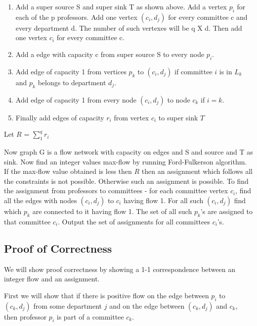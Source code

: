 \documentclass[11pt]{article}
\begin{document}
\begin{enumerate}
\item Add a super source S and super sink T as shown above. Add a vertex $p_i$ for each of the p professors. Add one vertex $(c_i,d_j)$ for every committee c and every department d. The number of such vertexes will be q X d. Then add one vertex $c_i$ for every committee c.
\item Add a edge with capacity c from super source S to every node $p_i$. 
\item Add edge of capacity 1 from vertices $p_k$ to $(c_i,d_j)$ if committee $i$ is in $L_k$ and $p_k$ belongs to department $d_j$.
\item Add edge of capacity 1 from every node $(c_i,d_j)$ to node $c_k$ if $i = k$.
\item Finally add edges of capacity $r_i$ from vertex $c_i$ to super sink $T$
\end{enumerate}

Let $R$ = $\sum\limits_{1}^{q}r_i$	

Now graph G is a flow network with capacity on edges and S and source and T as sink. Now find an integer values max-flow by running Ford-Fulkerson algorithm. If the max-flow value obtained is less then $R$ then an assignment which follows all the constraints is not possible. Otherwise such an assignment is possible. To find the assignment from professors to committees - for each committee vertex $c_i$, find all the edges with nodes $(c_i,d_j)$ to $c_i$ having flow 1. For all such $(c_i,d_j)$ find which $p_k$ are connected to it having flow 1. The set of all such $p_k$'s are assigned to that committee $c_i$. Output the set of assignments for all committees $c_i$'s.
\subsection{Proof of Correctness}

We will show proof correctness by showing a 1-1 correspondence between an integer flow and an assignment. 

First we will show that if there is positive flow on the edge between $p_i$ to $(c_k,d_j)$ from some department $j$ and on the edge between $(c_k,d_j)$ and $c_k$, then professor $p_i$ is part of a committee $c_k$.
\end{document}
